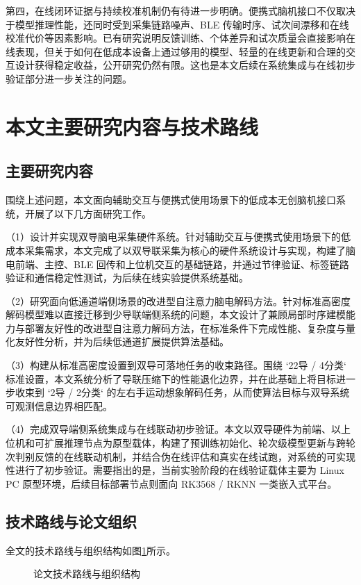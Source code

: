 第四，在线闭环证据与持续校准机制仍有待进一步明确。便携式脑机接口不仅取决于模型推理性能，还同时受到采集链路噪声、BLE 传输时序、试次间漂移和在线校准代价等因素影响。已有研究说明反馈训练、个体差异和试次质量会直接影响在线表现，但关于如何在低成本设备上通过够用的模型、轻量的在线更新和合理的交互设计获得稳定收益，公开研究仍然有限。这也是本文后续在系统集成与在线初步验证部分进一步关注的问题。

\section{本文主要研究内容与技术路线}
\subsection{主要研究内容}

围绕上述问题，本文面向辅助交互与便携式使用场景下的低成本无创脑机接口系统，开展了以下几方面研究工作。

（1）设计并实现双导脑电采集硬件系统。针对辅助交互与便携式使用场景下的低成本采集需求，本文完成了以双导联采集为核心的硬件系统设计与实现，构建了脑电前端、主控、BLE 回传和上位机交互的基础链路，并通过节律验证、标签链路验证和通信稳定性测试，为后续在线实验提供系统基础。

（2）研究面向低通道端侧场景的改进型自注意力脑电解码方法。针对标准高密度解码模型难以直接迁移到少导联端侧系统的问题，本文设计了兼顾局部时序建模能力与部署友好性的改进型自注意力解码方法，在标准条件下完成性能、复杂度与量化友好性分析，并为后续低通道扩展提供算法基础。

（3）构建从标准高密度设置到双导可落地任务的收束路径。围绕 `22导 / 4分类` 标准设置，本文系统分析了导联压缩下的性能退化边界，并在此基础上将目标进一步收束到 `2导 / 2分类` 的左右手运动想象解码任务，从而使算法目标与双导系统可观测信息边界相匹配。

（4）完成双导端侧系统集成与在线联动初步验证。本文以双导硬件为前端、以上位机和可扩展推理节点为原型载体，构建了预训练初始化、轮次级模型更新与跨轮次判别反馈的在线联动机制，并结合伪在线评估和真实在线试跑，对系统的可实现性进行了初步验证。需要指出的是，当前实验阶段的在线验证载体主要为 Linux PC 原型环境，后续目标部署节点则面向 RK3568 / RKNN 一类嵌入式平台。

\subsection{技术路线与论文组织}

全文的技术路线与组织结构如图\ref{fig:org}所示。
\begin{figure}[htbp]
  \centering
  \caption{论文技术路线与组织结构}
  \label{fig:org}
\end{figure}

